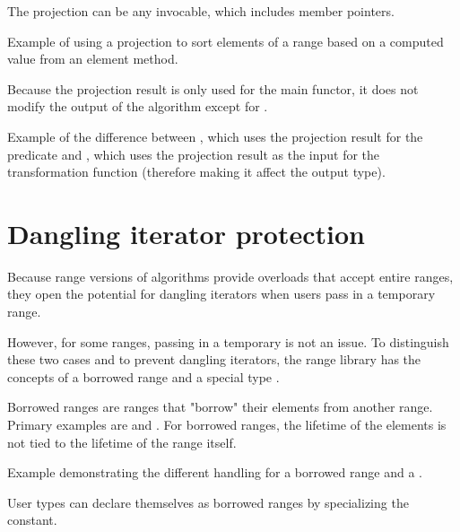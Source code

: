 The projection can be any invocable, which includes member pointers.

\begin{box-note}
\footnotesize Example of using a projection to sort elements of a range based on a computed value from an element method.
\tcblower
{}
\end{box-note}

Because the projection result is only used for the main functor, it does not modify the output of the algorithm except for .

\begin{box-note}
\footnotesize Example of the difference between , which uses the projection result for the predicate and , which uses the projection result as the input for the transformation function (therefore making it affect the output type).
\tcblower
{}
\end{box-note}

\section{Dangling iterator protection}

Because range versions of algorithms provide overloads that accept entire ranges, they open the potential for dangling iterators when users pass in a temporary range.

However, for some ranges, passing in a temporary is not an issue. To distinguish these two cases and to prevent dangling iterators, the range library has the concepts of a borrowed range and a special type .

Borrowed ranges are ranges that "borrow" their elements from another range. Primary examples are  and . For borrowed ranges, the lifetime of the elements is not tied to the lifetime of the range itself.

\begin{box-note}
\footnotesize Example demonstrating the different handling for a borrowed range  and a .
\tcblower
{}
\end{box-note}

User types can declare themselves as borrowed ranges by specializing the  constant.

